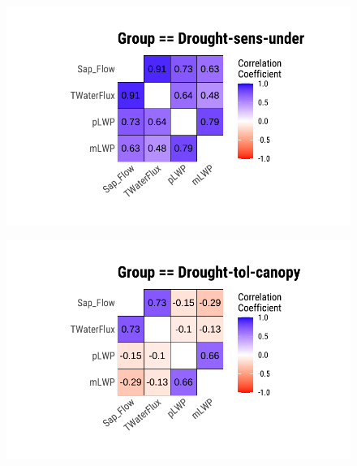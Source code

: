 \documentclass[
  letterpaper,
  DIV=11,
  numbers=noendperiod]{scrreprt}
\begin{document}
\begin{figure}[H]

{\centering \includegraphics{./CorrelateLikeDataMaster_files/figure-pdf/unnamed-chunk-5-2.pdf}

}

\end{figure}

\begin{figure}[H]

{\centering \includegraphics{./CorrelateLikeDataMaster_files/figure-pdf/unnamed-chunk-5-3.pdf}

}

\end{figure}
\end{document}

